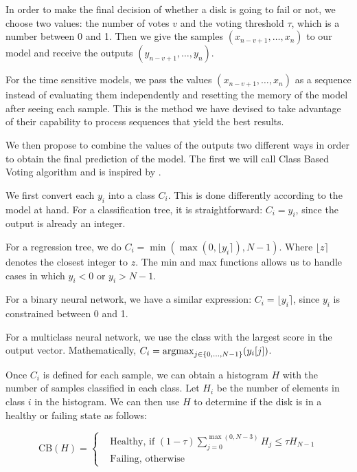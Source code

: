 In order to make the final decision of whether a disk is going to fail or not, we choose two values: the number of votes $v$ and the voting threshold $\tau$, which is a number between 0 and 1.
Then we give the samples $(x_{n-v+1},\dots,x_n)$ to our model and receive the outputs $(y_{n-v+1},\dots,y_n)$.

For the time sensitive models, we pass the values $(x_{n-v+1},\dots,x_n)$ as a sequence instead of evaluating them independently and resetting the memory of the model after seeing each sample.
This is the method we have devised to take advantage of their capability to process sequences that yield the best results.

We then propose to combine the values of the outputs two different ways in order to obtain the final prediction of the model.
The first we will call Class Based Voting algorithm and is inspired by \cite{Xu16}.

We first convert each $y_i$ into a class $C_i$.
This is done differently according to the model at hand.
For a classification tree, it is straightforward: $C_i = y_i$, since the output is already an integer.

For a regression tree, we do $C_i = \min(\max(0, \lfloor y_i \rceil), N-1)$.
Where $\lfloor z \rceil$ denotes the closest integer to $z$.
The min and max functions allows us to handle cases in which $y_i < 0$ or $y_i > N-1$.

For a binary neural network, we have a similar expression: $C_i = \lfloor y_i \rceil$, since $y_i$ is constrained between 0 and 1.

For a multiclass neural network, we use the class with the largest score in the output vector.
Mathematically, $C_i = \operatorname*{argmax}_{j\in\{0,\dots,N-1\}}(y_i[j])$.

Once $C_i$ is defined for each sample, we can obtain a histogram $H$ with the number of samples classified in each class.
Let $H_i$ be the number of elements in class $i$ in the histogram.
We can then use $H$ to determine if the disk is in a healthy or failing state as follows:

\begin{equation}\label{eq:class_based_voting}
    \text{CB}(H) = 
    \begin{cases}
        &\text{Healthy, if } (1-\tau)\sum_{j=0}^{\max(0,N-3)}H_j \leq \tau H_{N-1} \\
        & \text{Failing, otherwise} 
  \end{cases}
\end{equation}

